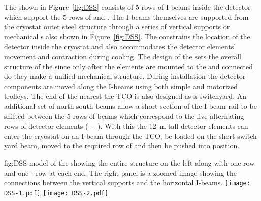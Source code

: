 The  shown in Figure~\ref{fig:DSS} consists of 5 rows of I-beams inside the detector which support the 5 rows of  and . 
The I-beams themselves are supported from the cryostat outer steel structure through a series of vertical supports or mechanical \fdth{}s also shown in Figure~\ref{fig:DSS}. 
The  constrains the location of the detector inside the cryostat and also accommodates the detector elements' movement and contraction during cooling. The design of the  sets the overall structure of the  since only after the elements are mounted to the  and connected do they make a unified mechanical structure. 
During installation the detector components are moved along the I-beams using both simple and motorized trolleys. 
The end of the  nearest the TCO is also designed as a switchyard. An additional set of north south beams allow a short section of the I-beam rail to be shifted between the 5 rows of  beams which correspond to the five alternating rows of detector elements  (----).  
With this the \SI{12}{m} tall detector elements can enter the cryostat on an I-beam through the TCO, be loaded on the short switch yard beam, moved to the required row of  and then be pushed into position. 

\begin{dunefigure}{fig:DSS}
  {\threed model of the  showing the entire
  structure on the left along with one  row and one
  - row at each end. The right panel is a zoomed image
  showing the connections between the vertical supports and the
  horizontal I-beams.}
\texttt{[image: DSS-1.pdf]}
 \texttt{[image: DSS-2.pdf]}
\end{dunefigure}




